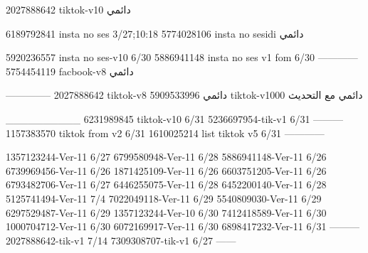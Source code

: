 2027888642 tiktok-v10
دائمي

6189792841 insta no ses
3/27;10:18
5774028106 insta no sesidi
دائمي


5920236557 insta no ses-v10
6/30
5886941148 insta no ses v1 fom
6/30
------------
5754454119 facbook-v8
دائمي


--------------
2027888642 tiktok-v8
دائمي
5909533996 tiktok-v1000
دائمي مع التحديث

__________
6231989845 tiktok-v10
6/31
5236697954-tik-v1
6/31
---------
1157383570 tiktok from v2
6/31
1610025214 list tiktok v5
6/31
------------

1357123244-Ver-11
6/27
6799580948-Ver-11
6/28
5886941148-Ver-11
6/26
6739969456-Ver-11
6/26
1871425109-Ver-11
6/26
6603751205-Ver-11
6/26
6793482706-Ver-11
6/27
6446255075-Ver-11
6/28
6452200140-Ver-11
6/28
5125741494-Ver-11
7/4
7022049118-Ver-11
6/29
5540809030-Ver-11
6/29
6297529487-Ver-11
6/29
1357123244-Ver-10
6/30
7412418589-Ver-11
6/30
1000704712-Ver-11
6/30
6072169917-Ver-11
6/30
6898417232-Ver-11
6/31
---------
2027888642-tik-v1
7/14
7309308707-tik-v1
6/27
------
